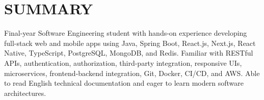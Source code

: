 \section{SUMMARY}
\noindent Final-year Software Engineering student with hands-on experience developing full-stack web and mobile apps using Java, Spring Boot, React.js, Next.js, React Native, TypeScript, PostgreSQL, MongoDB, and Redis. Familiar with RESTful APIs, authentication, authorization, third-party integration, responsive UIs, microservices, frontend-backend integration, Git, Docker, CI/CD, and AWS. Able to read English technical documentation and eager to learn modern software architectures.
